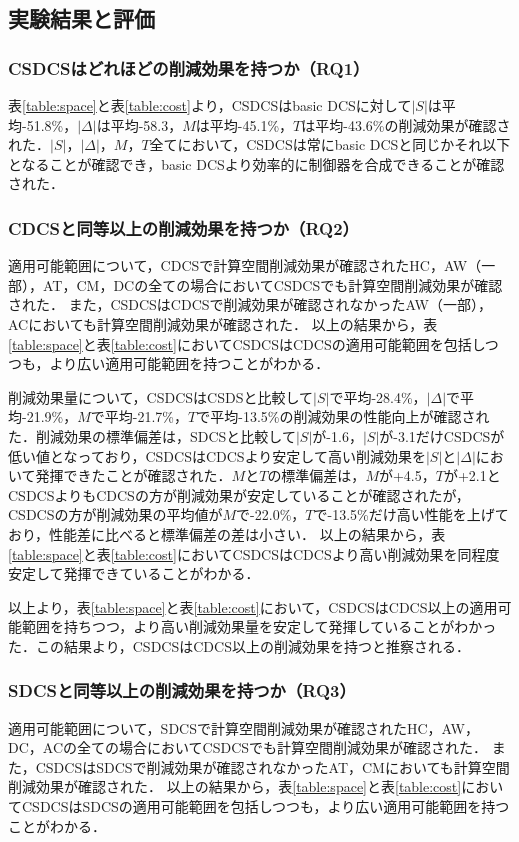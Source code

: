 

\subsection{実験結果と評価}

\subsubsection{CSDCSはどれほどの削減効果を持つか（RQ1）}
表\ref{table:space}と表\ref{table:cost}より，CSDCSはbasic DCSに対して$|S|$は平均-51.8\%，$|\Delta|$は平均-58.3，$M$は平均-45.1\%，$T$は平均-43.6\%の削減効果が確認された．$|S|$，$|\Delta|$，$M$，$T$全てにおいて，CSDCSは常にbasic DCSと同じかそれ以下となることが確認でき，basic DCSより効率的に制御器を合成できることが確認された．

\subsubsection{CDCSと同等以上の削減効果を持つか（RQ2）}
適用可能範囲について，CDCSで計算空間削減効果が確認されたHC，AW（一部），AT，CM，DCの全ての場合においてCSDCSでも計算空間削減効果が確認された．
また，CSDCSはCDCSで削減効果が確認されなかったAW（一部），ACにおいても計算空間削減効果が確認された．
以上の結果から，表\ref{table:space}と表\ref{table:cost}においてCSDCSはCDCSの適用可能範囲を包括しつつも，より広い適用可能範囲を持つことがわかる．

削減効果量について，CSDCSはCSDSと比較して$|S|$で平均-28.4\%，$|\Delta|$で平均-21.9\%，$M$で平均-21.7\%，$T$で平均-13.5\%の削減効果の性能向上が確認された．削減効果の標準偏差は，SDCSと比較して$|S|$が-1.6，$|S|$が-3.1だけCSDCSが低い値となっており，CSDCSはCDCSより安定して高い削減効果を$|S|$と$|\Delta|$において発揮できたことが確認された．$M$と$T$の標準偏差は，$M$が+4.5，$T$が+2.1とCSDCSよりもCDCSの方が削減効果が安定していることが確認されたが，CSDCSの方が削減効果の平均値が$M$で-22.0\%，$T$で-13.5\%だけ高い性能を上げており，性能差に比べると標準偏差の差は小さい．
以上の結果から，表\ref{table:space}と表\ref{table:cost}においてCSDCSはCDCSより高い削減効果を同程度安定して発揮できていることがわかる．

以上より，表\ref{table:space}と表\ref{table:cost}において，CSDCSはCDCS以上の適用可能範囲を持ちつつ，より高い削減効果量を安定して発揮していることがわかった．この結果より，CSDCSはCDCS以上の削減効果を持つと推察される．

\subsubsection{SDCSと同等以上の削減効果を持つか（RQ3）}
適用可能範囲について，SDCSで計算空間削減効果が確認されたHC，AW，DC，ACの全ての場合においてCSDCSでも計算空間削減効果が確認された．
また，CSDCSはSDCSで削減効果が確認されなかったAT，CMにおいても計算空間削減効果が確認された．
以上の結果から，表\ref{table:space}と表\ref{table:cost}においてCSDCSはSDCSの適用可能範囲を包括しつつも，より広い適用可能範囲を持つことがわかる．

